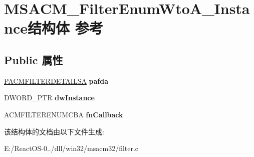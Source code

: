 \hypertarget{struct_m_s_a_c_m___filter_enum_wto_a___instance}{}\section{M\+S\+A\+C\+M\+\_\+\+Filter\+Enum\+Wto\+A\+\_\+\+Instance结构体 参考}
\label{struct_m_s_a_c_m___filter_enum_wto_a___instance}
\subsection*{Public 属性}
\begin{DoxyCompactItemize}
\item 
\mbox{\label{struct_m_s_a_c_m___filter_enum_wto_a___instance_aa1af858b6944af60dc2b4ac64023fc90}} 
\hyperlink{struct___a_c_m_f_i_l_t_e_r_d_e_t_a_i_l_s_a}{P\+A\+C\+M\+F\+I\+L\+T\+E\+R\+D\+E\+T\+A\+I\+L\+SA} {\bfseries pafda}
\item 
\mbox{\label{struct_m_s_a_c_m___filter_enum_wto_a___instance_a7bed07405f9dbe4d1d3f6c328a09bdbb}} 
D\+W\+O\+R\+D\+\_\+\+P\+TR {\bfseries dw\+Instance}
\item 
\mbox{\label{struct_m_s_a_c_m___filter_enum_wto_a___instance_a1ea639707ea34c94b0828726018bc910}} 
A\+C\+M\+F\+I\+L\+T\+E\+R\+E\+N\+U\+M\+C\+BA {\bfseries fn\+Callback}
\end{DoxyCompactItemize}


该结构体的文档由以下文件生成\+:\begin{DoxyCompactItemize}
\item 
E\+:/\+React\+O\+S-\/0../dll/win32/msacm32/filter.\+c\end{DoxyCompactItemize}
